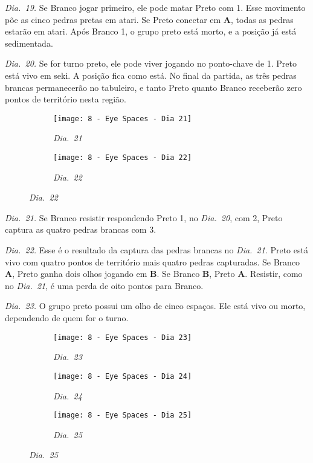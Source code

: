\emph{Dia.\@~19.} Se Branco jogar primeiro, ele pode matar Preto com 1. Esse movimento põe as cinco pedras pretas em atari. Se Preto conectar em \textbf{A}, todas as pedras estarão em atari. Após Branco 1, o grupo preto está morto, e a posição já está sedimentada.

\emph{Dia.\@~20.} Se for turno preto, ele pode viver jogando no ponto-chave de 1. Preto está vivo em seki. A posição fica como está. No final da partida, as três pedras brancas permanecerão no tabuleiro, e tanto Preto quanto Branco receberão zero pontos de território nesta região.

\pagebreak

\begin{figure}[h!]
    \centering
    \begin{subfigure}[t]{.31\textwidth}
        \texttt{[image: 8 - Eye Spaces - Dia 21]}
        \caption*{\emph{Dia.\@~21}}
    \end{subfigure}
    \hspace{1cm}
    \begin{subfigure}[t]{.31\textwidth}
        \texttt{[image: 8 - Eye Spaces - Dia 22]}
        \caption*{\emph{Dia.\@~22}}
    \end{subfigure}
\end{figure}

\emph{Dia.\@~21.} Se Branco resistir respondendo Preto 1, no \emph{Dia.\@~20}, com 2, Preto captura as quatro pedras brancas com 3.

\emph{Dia.\@~22.} Esse é o resultado da captura das pedras brancas no \emph{Dia.\@~21}. Preto está vivo com quatro pontos de território mais quatro pedras capturadas. Se Branco \textbf{A}, Preto ganha dois olhos jogando em \textbf{B}. Se Branco \textbf{B}, Preto \textbf{A}. Resistir, como no \emph{Dia.\@~21}, é uma perda de oito pontos para Branco.

\emph{Dia.\@~23.} O grupo preto possui um olho de cinco espaços. Ele está vivo ou morto, dependendo de quem for o turno.

\begin{figure}[h!]
    \centering
    \begin{subfigure}[t]{.31\textwidth}
        \texttt{[image: 8 - Eye Spaces - Dia 23]}
        \caption*{\emph{Dia.\@~23}}
    \end{subfigure}
    \hfill
    \begin{subfigure}[t]{.31\textwidth}
        \texttt{[image: 8 - Eye Spaces - Dia 24]}
        \caption*{\emph{Dia.\@~24}}
    \end{subfigure}
    \hfill
    \begin{subfigure}[t]{.31\textwidth}
        \texttt{[image: 8 - Eye Spaces - Dia 25]}
        \caption*{\emph{Dia.\@~25}}
    \end{subfigure}
\end{figure}

